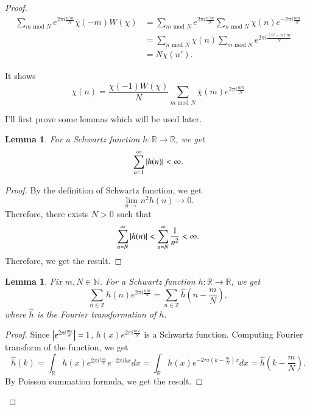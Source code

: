 \documentclass[a4paper, 12pt]{article}
\theoremstyle{Mydefinition}
\theoremstyle{Mytheorem}
\newtheorem{lemma}[statement]{Lemma}
\begin{document}
\begin{proof}
\begin{equation*}
\begin{split}
     \sum_{m\textrm{ mod } N}e^{2\pi i \frac{n'm}{N}}\overline{\chi}(-m)W(\chi) &= \sum_{m\textrm{ mod } N}e^{2\pi i \frac{n'm}{N}}\sum_{n\textrm{ mod }N} \chi(n)e^{-2\pi i \frac{nm}{N}}\\
    &=\sum_{n\textrm{ mod }N} \chi(n)\sum_{m\textrm{ mod } N} e^{2\pi i \frac{(n'-n)m}{N}}\\
    &=N\chi(n').
\end{split}
\end{equation*}

It shows
\begin{equation*}
    \chi(n) = \frac{\chi(-1)W(\chi)}{N}\sum_{m\textrm{ mod } N}\overline{\chi}(m)e^{2\pi i \frac{nm}{N}}
\end{equation*}

I'll first prove some lemmas which will be used later.
\begin{lemma}
    For a Schwartz function $h:\mathbb{R}\rightarrow\mathbb{R}$, we get
    \begin{equation*}
        \sum_{n=1}^\infty \abs{h(n)}<\infty.
    \end{equation*}
\end{lemma}
\begin{proof}
    By the definition of Schwartz function, we get
    \begin{equation*}
        \lim_{n\rightarrow} n^2{h(n)}\rightarrow 0.
    \end{equation*}
    Therefore, there exists $N>0$ such that
    \begin{equation*}
        \sum_{n=N}^\infty \abs{h(n)}<\sum_{n=N}^\infty \frac{1}{n^2}<\infty.
    \end{equation*}
    Therefore, we get the result.
\end{proof}

\begin{lemma}
    Fix $m,N\in\mathbb{N}$. For a Schwartz function $h:\mathbb{R}\rightarrow\mathbb{R}$, we get
    \begin{equation*}
        \sum_{n\in\mathbb{Z}}h(n)e^{2\pi i \frac{nm}{N}} = \sum_{n\in\mathbb{Z}}\hat{h}\left(n-\frac{m}{N}\right),
    \end{equation*}
    where $\hat{h}$ is the Fourier transformation of $h$.
\end{lemma}
\begin{proof}
Since $\abs{e^{2\pi i \frac{mx}{N}}}=1$, $h(x)e^{2\pi i \frac{mx}{N}}$ is a Schwartz function. Computing Fourier transform of the function, we get
\begin{equation*}
    \hat{h}(k) = \int_\mathbb{R} h(x) e^{2\pi i \frac{mx}{N}}e^{-2\pi i k x} dx = \int_\mathbb{R} h(x) e^{-2\pi i \left(k-\frac{m}{N}\right)x} dx = \hat{h}\left(k-\frac{m}{N}\right).
\end{equation*}
By Poisson summation formula, we get the result.
\end{proof}


\end{proof}
\end{document}
